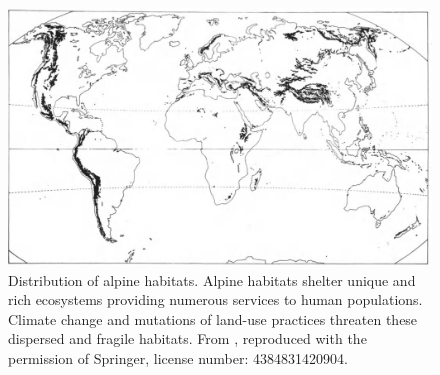 \begin{figure}
\includegraphics{./1_Introduction/graphics/alpine_distribution.jpeg}
\caption{Distribution of alpine habitats. Alpine habitats shelter unique and rich ecosystems providing numerous services to human populations. Climate change and mutations of land-use practices threaten these dispersed and fragile habitats. From \cite{korner_alpine_2003}, reproduced with the permission of Springer, license number: 4384831420904.} \label{fig:distribution}
\end{figure}
